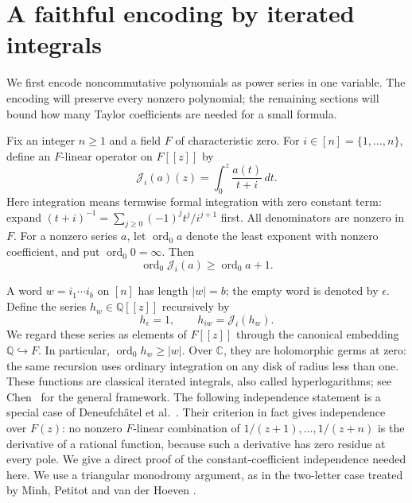 \section{A faithful encoding by iterated integrals}
\label{sec:iterated-integrals}

We first encode noncommutative polynomials as power series in one variable.
The encoding will preserve every nonzero polynomial; the remaining sections
will bound how many Taylor coefficients are needed for a small formula.

Fix an integer $n\geq 1$ and a field $F$ of characteristic zero.
For $i\in[n]=\{1,\ldots,n\}$, define an $F$-linear operator on $F[[z]]$ by
\begin{equation}
  \mathcal J_i(a)(z)=\int_0^z\frac{a(t)}{t+i}\,dt.
  \label{eq:integration-operator}
\end{equation}
Here integration means termwise formal integration with zero constant term:
expand $(t+i)^{-1}=\sum_{j\geq0}(-1)^j t^j/i^{j+1}$ first.
All denominators are nonzero in $F$.
For a nonzero series $a$, let $\operatorname{ord}_0 a$ denote the least
exponent with nonzero coefficient, and put $\operatorname{ord}_0 0=\infty$.
Then
\begin{equation}
  \operatorname{ord}_0\mathcal J_i(a)
  \geq \operatorname{ord}_0 a+1.
  \label{eq:integration-order}
\end{equation}

A word $w=i_1\cdots i_b$ on $[n]$ has length $|w|=b$;
the empty word is denoted by $\epsilon$.
Define the series $h_w\in\mathbb Q[[z]]$ recursively by
\begin{equation}
  h_\epsilon=1,\qquad h_{iw}=\mathcal J_i(h_w).
  \label{eq:word-series}
\end{equation}
We regard these series as elements of $F[[z]]$ through the canonical
embedding $\mathbb Q\hookrightarrow F$.
In particular, $\operatorname{ord}_0 h_w\geq |w|$.
Over $\mathbb C$, they are holomorphic germs at zero: the same recursion
uses ordinary integration on any disk of radius less than one.
These functions are classical iterated integrals, also called
hyperlogarithms; see Chen~\cite{Chen1977} for the general framework.
The following independence statement is a special case of
Deneufch\^atel et al.~\cite[Theorem~1]{DeneufchatelEtAl2011}.
Their criterion in fact gives independence over $F(z)$: no nonzero
$F$-linear combination of $1/(z+1),\ldots,1/(z+n)$ is the derivative
of a rational function, because such a derivative has zero residue
at every pole. We give a direct proof of the constant-coefficient
independence needed here.
We use a triangular monodromy argument, as in the two-letter case treated
by Minh, Petitot and van der Hoeven
\cite[Section~5, Theorem~4]{MinhPetitotVanderHoeven1998}.

